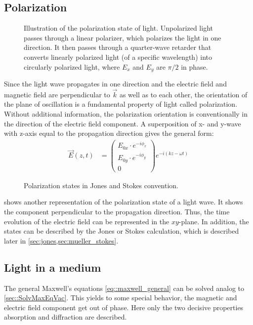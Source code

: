 \subsection{Polarization}\label{sec:polarization}
%
\begin{figure}[!t]
\centering
\setlength{\tikzwidth}{\textwidth}
\caption{Illustration of the polarization state of light. Unpolarized light passes through a linear polarizer, which polarizes the light in one direction. It then passes through a quarter-wave retarder that converts linearly polarized light (of a specific wavelength) into circularly polarized light, where $E_x$ and $E_y$ are $\pi/2$ in phase.}
\label{fig:polarization_state}
\end{figure}
%
Since the light wave propagates in one direction and the electric field and magnetic field are perpendicular to $\vec{k}$ as well as to each other, the orientation of the plane of oscillation is a fundamental property of light called polarization.
Without additional information, the polarization orientation is conventionally in the direction of the electric field component.
A superposition of x- and y-wave with z-axis equal to the propagation direction gives the general form:
\begin{align}
\vec{E}(z,t) &= \begin{pmatrix} E_{0x} \cdot e^{ -i \phi_x } \\ E_{0y} \cdot e^{ -i \phi_y } \\ 0 \end{pmatrix}
e^{ -i (kz - \omega t)}
\end{align}
%
\begin{figure}[!t]
\centering

\caption{Polarization states in Jones and Stokes convention.}
\label{fig:polarization_state_vectors}
\end{figure}
%
 shows another representation of the polarization state of a light wave.
It shows the component perpendicular to the propagation direction.
Thus, the time evolution of the electric field can be represented in the $xy$-plane.
In addition, the states can be described by the Jones or Stokes calculation, which is described later in \cref{sec:jones,sec:mueller_stokes}.
%
%
%
\subsection{Light in a medium}
%
The general Maxwell's equations \cref{eq::maxwell_general} can be solved analog to \cref{sec::SolvMaxEqVac}. This yields to some special behavior, \eg{} the magnetic and electric field component get out of phase.
Here only the two decisive properties absorption and diffraction are described.
% 
% 
%
